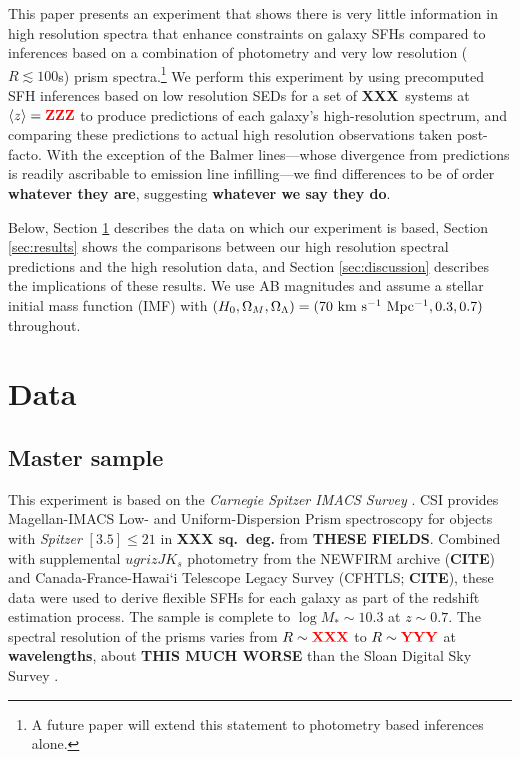 \documentclass[a4paper,fleqn,usenatbib]{mnras}
\newcommand{\Mstel}{M_\ast}
\newcommand{\bfr}{\bf\color{red}}
\newcommand{\ntot}{{\bfr XXX}} %
\newcommand{\midz}{{\bfr ZZZ}} %
\newcommand{\CITE}{{\bfr CITE}}
\begin{document}
This paper presents an experiment that shows there is very little information in high resolution spectra
that enhance constraints on galaxy SFHs compared to inferences based on a combination of photometry and 
very low resolution ($R\lesssim100$s) prism spectra.\footnote{A future paper will extend this statement 
to photometry based inferences alone.} We perform this experiment by using precomputed SFH inferences
based on low resolution SEDs for a set of \ntot\ systems at $\langle z\rangle=\midz$ to produce predictions 
of each galaxy's high-resolution spectrum, and comparing these predictions to actual high resolution 
observations taken post-facto. With the exception of the Balmer lines---whose divergence from predictions 
is readily ascribable to emission line infilling---we find differences to be of order {\bfr whatever they are}, 
suggesting {\bfr whatever we say they do}.

Below, Section \ref{sec:data} describes the data on which our experiment is based, Section \ref{sec:results} 
shows the comparisons between our high resolution spectral predictions and the high resolution data, and
Section \ref{sec:discussion} describes the implications of these results. We use AB magnitudes and assume 
a \citet{Chabrier03} stellar initial mass function (IMF) with $(H_{0}, \Omega_{M}, \Omega_{\Lambda}) =
(70~{\rm km~s^{-1}~Mpc^{-1}}, 0.3, 0.7)$ throughout.



\section{Data}
\label{sec:data}

\subsection{Master sample}
\label{sec:master}

This experiment is based on the {\it Carnegie Spitzer IMACS Survey} \citep[CSI;][]{Kelson14a}. CSI provides
Magellan-IMACS Low- and Uniform-Dispersion Prism spectroscopy for objects with {\it Spitzer} 
$[3.5]\leq21$ in {\bfr XXX sq.~deg.} from {\bfr THESE FIELDS}. Combined with supplemental 
$ugrizJK_{s}$ photometry from the NEWFIRM archive (\CITE) and Canada-France-Hawai`i Telescope 
Legacy Survey (CFHTLS; \CITE), these data were used to derive flexible SFHs for each galaxy as part of 
the redshift estimation process. The sample is complete to $\log\Mstel\sim10.3$ at $z\sim0.7$.
The spectral resolution of the prisms varies from $R\sim{\bfr XXX}$ to $R\sim{\bfr YYY}$ at
{\bfr wavelengths}, about {\bfr THIS MUCH WORSE} than the Sloan Digital Sky Survey \citep{York00}.
\end{document}
